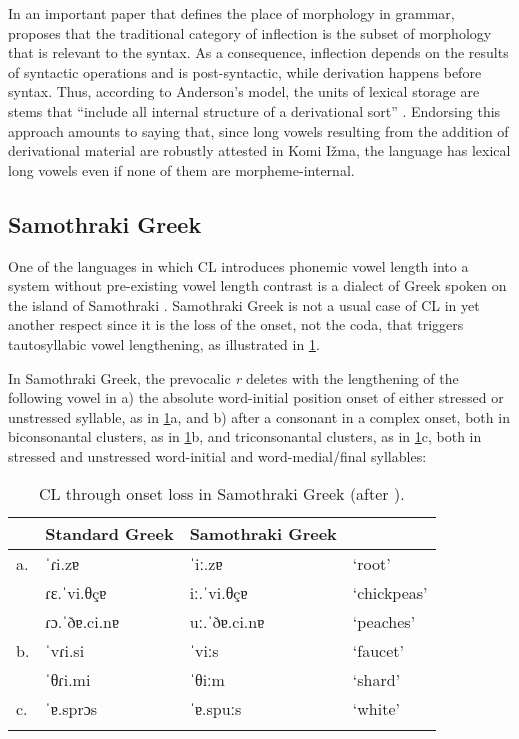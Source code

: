 \documentclass[output=paper,
modfonts
]{LSP/langsci}
\begin{document}
In an important paper that defines the place of morphology in grammar,
\citet{anderson1982} proposes that the traditional category of inflection is
the subset of morphology that is relevant to the syntax. As a
consequence, inflection depends on the results of syntactic operations
and is post-syntactic, while derivation happens before syntax. Thus,
according to Anderson's model, the units of lexical storage are stems
that ``include all internal structure of a derivational sort'' \citep[592]{anderson1982}. Endorsing this approach amounts to saying that, since long
vowels resulting from the addition of derivational material are robustly
attested in Komi Ižma, the language has lexical long vowels even if none
of them are morpheme-internal.

\subsection{Samothraki Greek}

One of the languages in which CL introduces phonemic vowel length into a
system without pre-existing vowel length contrast is a dialect of Greek
spoken on the island of Samothraki \citep{newton1972a,newton1972b,hayes1989k,katsanis1996,sumner1999,kavitskaya2002,topintzi2006k,kiparsky2011k,katsika2015}. Samothraki Greek is not a usual case
of CL in yet another respect since it is the loss of the onset, not the
coda, that triggers tautosyllabic vowel lengthening, as illustrated in
\cref{tab:clolosssamgk}.

In Samothraki Greek, the prevocalic \emph{r} deletes with the
lengthening of the following vowel in a) the absolute word-initial
position onset of either stressed or unstressed syllable, as in \cref{tab:clolosssamgk}a,
and b) after a consonant in a complex onset, both in biconsonantal
clusters, as in \cref{tab:clolosssamgk}b, and triconsonantal clusters, as in \cref{tab:clolosssamgk}c, both
in stressed and unstressed word-initial and word-medial/final syllables:

\begin{table}
\begin{tabular}{llll}
\lsptoprule
	&	Standard Greek	&	Samothraki Greek	&		\\
\midrule
a.	&	 ˈɾi.zɐ 			&	ˈiː.zɐ 			&	`root' \\
	&	ɾɛ.ˈvi.θçɐ 		&	iː.ˈvi.θçɐ 		&	`chickpeas'\\
	&	ɾɔ.ˈðɐ.ci.nɐ 	&	uː.ˈðɐ.ci.nɐ 		&	`peaches'\\[0.75ex]
b.	&	ˈvɾi.si 			&	ˈviːs 			&	`faucet'\\
	&	ˈθɾi.mi			&	 ˈθiːm 			&	`shard'\\[0.75ex]
c.	&	 ˈɐ.sprɔs 		&	ˈɐ.spuːs 			&	`white' \\
\lspbottomrule
\end{tabular}
\caption{CL through onset loss in Samothraki Greek (after \citealt{katsika2015}).\protect\footnotemark}
\label{tab:clolosssamgk}
\end{table}
\end{document}

